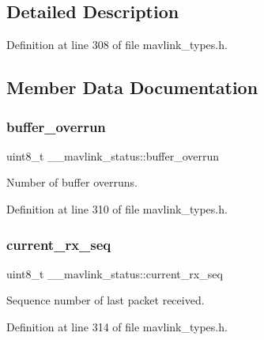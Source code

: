 \subsection{Detailed Description}


Definition at line 308 of file mavlink\+\_\+types.\+h.



\subsection{Member Data Documentation}
\mbox{\label{struct____mavlink__status_ae0ceb5a136021ee78c953f2e86d772cb}} 
\subsubsection{\texorpdfstring{buffer\_overrun}{buffer\_overrun}}
{\footnotesize\ttfamily uint8\+\_\+t \+\_\+\+\_\+mavlink\+\_\+status\+::buffer\+\_\+overrun}



Number of buffer overruns. 



Definition at line 310 of file mavlink\+\_\+types.\+h.

\mbox{\label{struct____mavlink__status_affbdd32b3dff8ae35327a79ed6b17646}} 
\subsubsection{\texorpdfstring{current\_rx\_seq}{current\_rx\_seq}}
{\footnotesize\ttfamily uint8\+\_\+t \+\_\+\+\_\+mavlink\+\_\+status\+::current\+\_\+rx\+\_\+seq}



Sequence number of last packet received. 



Definition at line 314 of file mavlink\+\_\+types.\+h.

\mbox{\label{struct____mavlink__status_a06482d6c3fbfa829526c9b2e2e895f32}} 
